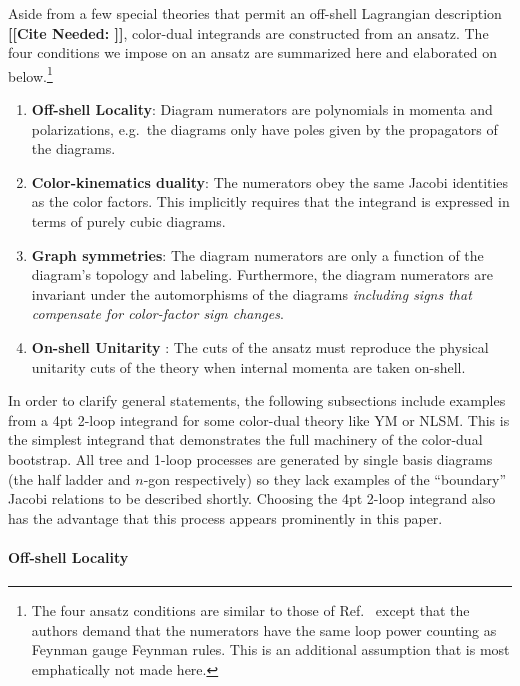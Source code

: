 \documentclass[11pt,letter]{article}
\newcommand{\eg}{e.g.~}
\newcommand{\citepls}[1]{{\bf\color{red}[[Cite Needed: #1]]}}
\begin{document}
Aside from a few special theories that permit an off-shell Lagrangian description \citepls{}, color-dual integrands are constructed from an ansatz. The four conditions we impose on an ansatz are summarized here and elaborated on below.\footnote{The four ansatz conditions are similar to those of Ref.~\cite{Bern:2015ooa} except that the authors demand that the numerators have the same loop power counting as Feynman gauge Feynman rules.  This is an additional assumption that is most emphatically not made here.}
\begin{enumerate}
\item \textbf{Off-shell Locality}: Diagram numerators are polynomials in momenta and
  polarizations, \eg the diagrams only have poles given by the
  propagators of the diagrams.
  \item  \textbf{Color-kinematics duality}: The numerators obey the same Jacobi identities as the color factors.
This implicitly requires that the integrand is expressed in terms of purely cubic diagrams.
\item  \textbf{Graph symmetries}: The diagram numerators are only a function of the diagram's topology and labeling.  Furthermore, the diagram numerators are invariant under the automorphisms of the diagrams \emph{including signs that compensate for color-factor sign changes}.
\item  \textbf{On-shell Unitarity }: The cuts of the ansatz must reproduce the physical unitarity cuts of the theory when internal momenta are taken on-shell.
\end{enumerate}

In order to clarify general statements, the following subsections include examples from a 4pt 2-loop integrand for some color-dual theory like YM or NLSM.
This is the simplest integrand that demonstrates the full machinery of the color-dual bootstrap.
All tree and 1-loop processes are generated by single basis diagrams (the half ladder and $n$-gon respectively) so they lack examples of the ``boundary'' Jacobi relations to be described shortly.
Choosing the 4pt 2-loop integrand also has the advantage that this process appears prominently in this paper.

\paragraph{Off-shell Locality}
\end{document}

